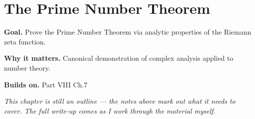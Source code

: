 \chapter{The Prime Number Theorem}
\label{ch:08-complex-analysis-and-harmonic-analysis-08}

\begin{chapterintro}
\textbf{Goal.} Prove the Prime Number Theorem via analytic properties of the Riemann zeta function.

\textbf{Why it matters.} Canonical demonstration of complex analysis applied to number theory.

\textbf{Builds on.} Part VIII Ch.7
\end{chapterintro}

\textit{This chapter is still an outline --- the notes above mark out what it needs to cover. The full write-up comes as I work through the material myself.}
